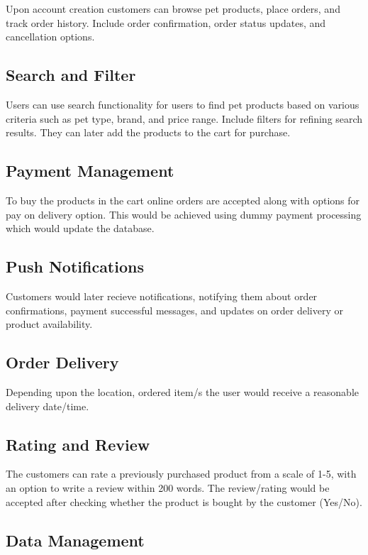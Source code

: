 \documentclass{article}
\begin{document}
Upon account creation customers can browse pet products, place orders, and track order history. Include order confirmation, order status updates, and cancellation options.

\subsection{Search and Filter}

Users can use search functionality for users to find pet products based on various criteria such as pet type, brand, and price range. Include filters for refining search results. They can later add the products to the cart for purchase.

\subsection{Payment Management}

To buy the products in the cart online orders are accepted along with options for pay on delivery option. This would be achieved using dummy payment processing which would update the database. 

\subsection{Push Notifications}

Customers would later recieve notifications, notifying them about order confirmations, payment successful messages, and updates on order delivery or product availability.

\subsection{Order Delivery}

Depending upon the location, ordered item/s the user would receive a reasonable delivery date/time.

\subsection{Rating and Review}

The customers can rate a previously purchased product from a scale of 1-5, with an option to write a review within 200 words.
The review/rating would be accepted after checking whether the product is bought by the customer (Yes/No).

\subsection{Data Management}
\end{document}
